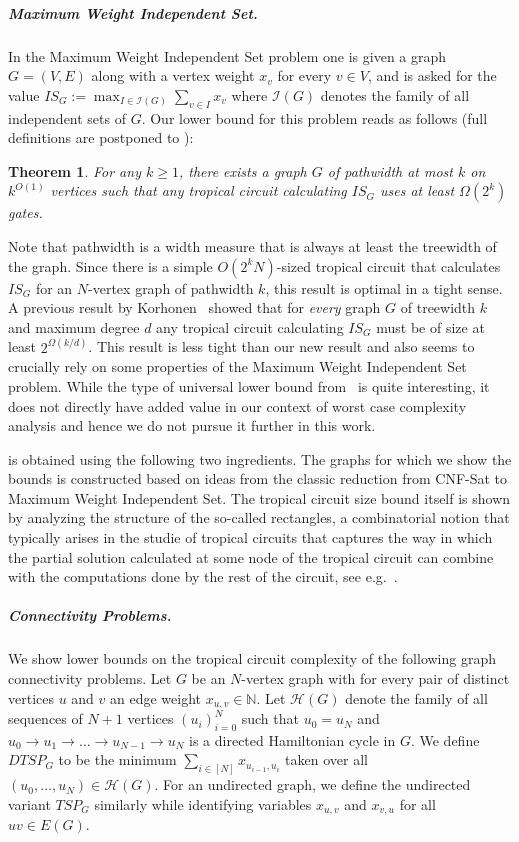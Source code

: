 \documentclass[11pt,a4paper]{article}
\newtheorem{theorem}[lemma]{Theorem}
\begin{document}
\subparagraph{Maximum Weight Independent Set.}
In the Maximum Weight Independent Set problem one is given a graph $G=(V,E)$ along with a vertex weight $x_v$ for every $v \in V$, and is asked for the value $IS_G:=\max_{I \in \mathcal{I}(G)}\sum_{v \in I}x_v$ where $\mathcal{I}(G)$ denotes the family of all independent sets of $G$. Our lower bound for this problem reads as follows (full definitions are postponed to ):

\begin{theorem}\label{thm:main_is}
    For any $k \geq 1$, there exists a graph $G$ of pathwidth at most $k$ on $k^{O(1)}$ vertices such that any tropical circuit calculating $IS_G$ uses at least $\Omega(2^k)$ gates.
\end{theorem}
Note that pathwidth is a width measure that is always at least the treewidth of the graph.
Since there is a simple $O(2^{k}N)$-sized tropical circuit that calculates $IS_G$ for an $N$-vertex graph of pathwidth $k$, this result is optimal in a tight sense.
A previous result by Korhonen~\cite{Korhonen21} showed that for \emph{every} graph $G$ of treewidth $k$ and maximum degree $d$ any tropical circuit calculating $IS_G$ must be of size at least $2^{\Omega(k/d)}$.
This result is less tight than our new result and also seems to crucially rely on some properties of the Maximum Weight Independent Set problem. While the type of universal lower bound from~\cite{Korhonen21} is quite interesting, it does not directly have added value in our context of worst case complexity analysis and hence we do not pursue it further in this work.

 is obtained using the following two ingredients. The graphs for which we show the bounds is constructed based on ideas from the classic reduction from CNF-Sat to Maximum Weight Independent Set. The tropical circuit size bound itself is shown by analyzing the structure of the so-called rectangles, a combinatorial notion that typically arises in the studie of tropical circuits that captures the way in which the partial solution calculated at some node of the tropical circuit can combine with the computations done by the rest of the circuit, see e.g.~\cite{Jukna2023}.

\subparagraph{Connectivity Problems.}
We show lower bounds on the tropical circuit complexity of the following graph connectivity problems. Let $G$ be an $N$-vertex graph with for every pair of distinct vertices $u$ and $v$ an edge weight $x_{u,v}\in \mathbb{N}$. Let $\mathcal{H}(G)$ denote the family of all sequences of $N + 1$ vertices $(u_i)_{i =0}^N$ such that $u_0 = u_N$ and $u_0 \to u_1 \to \dots \to u_{N - 1} \to u_N$ is a directed Hamiltonian cycle in $G$.
We define $DTSP_G$ to be the minimum $\sum_{i\in [N]}x_{u_{i-1},u_i}$ taken over all $(u_0,\ldots,u_N) \in \mathcal{H}(G)$. For an undirected graph, we define the undirected variant $TSP_G$ similarly while identifying variables $x_{u,v}$ and $x_{v, u}$ for all $uv \in E(G)$.
\end{document}
